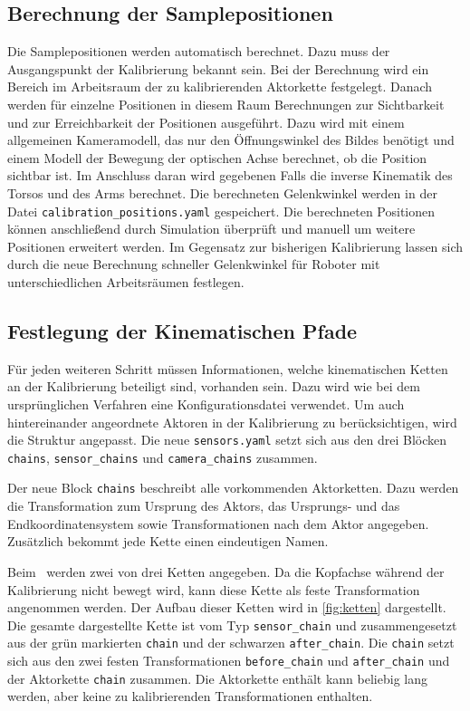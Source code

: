 \subsection{Berechnung der Samplepositionen}
\label{sub:Berechnung der Samplepositionen}
Die Samplepositionen werden automatisch berechnet. Dazu muss der Ausgangspunkt 
der Kalibrierung bekannt sein. Bei der Berechnung wird ein Bereich im Arbeitsraum
der zu kalibrierenden Aktorkette festgelegt. Danach werden für einzelne
Positionen in diesem Raum Berechnungen zur Sichtbarkeit und zur Erreichbarkeit 
der Positionen ausgeführt. Dazu wird mit einem allgemeinen Kameramodell, das nur
den Öffnungswinkel des Bildes benötigt und einem Modell der Bewegung der 
optischen Achse berechnet, ob die Position sichtbar ist. Im Anschluss daran wird
gegebenen Falls die inverse Kinematik des Torsos und des Arms berechnet. Die 
berechneten Gelenkwinkel werden in der Datei \texttt{calibration\_positions.yaml}
gespeichert. Die berechneten Positionen können anschließend durch Simulation
überprüft und manuell um weitere Positionen erweitert werden. Im Gegensatz zur 
bisherigen Kalibrierung lassen sich durch die neue Berechnung schneller
Gelenkwinkel für Roboter mit unterschiedlichen Arbeitsräumen festlegen. 

\subsection{Festlegung der Kinematischen Pfade}
\label{sub:Festlegung der Kinematischen Pfade}
Für jeden weiteren Schritt müssen Informationen, welche
kinematischen Ketten an der Kalibrierung beteiligt sind, vorhanden sein.
Dazu wird wie bei dem 
ursprünglichen Verfahren eine Konfigurationsdatei verwendet. Um auch 
hintereinander angeordnete Aktoren in der Kalibrierung zu berücksichtigen, wird 
die Struktur angepasst. Die neue \texttt{sensors.yaml} setzt sich aus den drei
Blöcken \texttt{chains}, \texttt{sensor\_chains} und \texttt{camera\_chains}
zusammen.

Der neue Block \texttt{chains} beschreibt alle vorkommenden Aktorketten. Dazu 
werden die Transformation zum Ursprung des Aktors, das Ursprungs- und das 
Endkoordinatensystem sowie Transformationen nach dem Aktor angegeben. Zusätzlich
bekommt jede Kette einen eindeutigen Namen.

Beim \cob\ werden zwei von drei Ketten angegeben. Da die Kopfachse während der
Kalibrierung nicht bewegt wird, kann diese Kette als feste Transformation 
angenommen werden. Der Aufbau dieser Ketten wird in \ref{fig:ketten}
dargestellt. Die gesamte dargestellte Kette ist vom Typ \texttt{sensor\_chain}
und zusammengesetzt aus der grün markierten \texttt{chain} und der schwarzen 
  \texttt{after\_chain}. Die \texttt{chain} setzt sich aus den zwei festen 
  Transformationen \texttt{before\_chain} und \texttt{after\_chain} und der
  Aktorkette \texttt{chain} zusammen. Die Aktorkette enthält kann beliebig 
  lang werden, aber keine zu kalibrierenden Transformationen enthalten.

